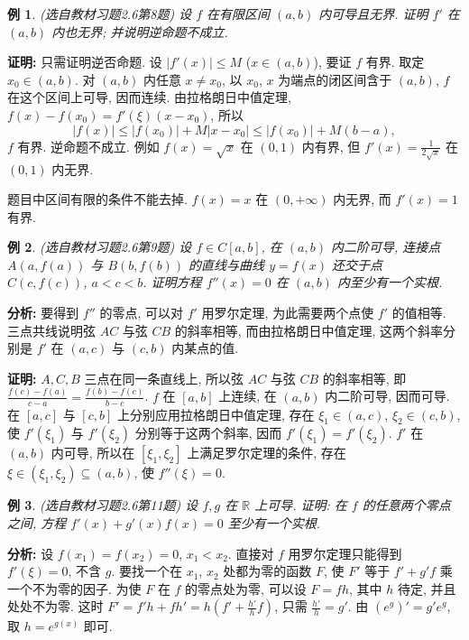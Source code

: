 \documentclass[UTF8,openany]{ctexbook}
\theoremstyle{chinesetextbook}
\newtheorem{example}{例}[section]
\newenvironment{cnproof}{\par\indent\textbf{证明:} \ignorespaces}{\par}
\begin{document}
\begin{example}\label{ex:c2-h6-8}
\textnormal{(选自教材习题2.6第8题)} 设 $f$ 在有限区间 $(a,b)$ 内可导且无界. 证明 $f'$ 在 $(a,b)$ 内也无界; 并说明逆命题不成立.
\end{example}
\begin{cnproof}
只需证明逆否命题. 设 $|f'(x)|\le M$ ($x\in(a,b)$), 要证 $f$ 有界. 取定 $x_0\in(a,b)$. 对 $(a,b)$ 内任意 $x\ne x_0$, 以 $x_0$, $x$ 为端点的闭区间含于 $(a,b)$, $f$ 在这个区间上可导, 因而连续. 由拉格朗日中值定理, $f(x)-f(x_0)=f'(\xi)(x-x_0)$, 所以
\[
|f(x)|\le|f(x_0)|+M|x-x_0|\le|f(x_0)|+M(b-a),
\]
$f$ 有界. 逆命题不成立. 例如 $f(x)=\sqrt x$ 在 $(0,1)$ 内有界, 但 $\displaystyle f'(x)=\frac1{2\sqrt x}$ 在 $(0,1)$ 内无界.
\end{cnproof}
题目中区间有限的条件不能去掉. $f(x)=x$ 在 $(0,+\infty)$ 内无界, 而 $f'(x)=1$ 有界.
\begin{example}\label{ex:c2-h6-9}
\textnormal{(选自教材习题2.6第9题)} 设 $f\in C[a,b]$, 在 $(a,b)$ 内二阶可导, 连接点 $A(a,f(a))$ 与 $B(b,f(b))$ 的直线与曲线 $y=f(x)$ 还交于点 $C(c,f(c))$, $a<c<b$. 证明方程 $f''(x)=0$ 在 $(a,b)$ 内至少有一个实根.
\end{example}
\par\indent\textbf{分析:} 要得到 $f''$ 的零点, 可以对 $f'$ 用罗尔定理, 为此需要两个点使 $f'$ 的值相等. 三点共线说明弦 $AC$ 与弦 $CB$ 的斜率相等, 而由拉格朗日中值定理, 这两个斜率分别是 $f'$ 在 $(a,c)$ 与 $(c,b)$ 内某点的值.
\begin{cnproof}
$A,C,B$ 三点在同一条直线上, 所以弦 $AC$ 与弦 $CB$ 的斜率相等, 即 $\displaystyle\frac{f(c)-f(a)}{c-a}=\frac{f(b)-f(c)}{b-c}$. $f$ 在 $[a,b]$ 上连续, 在 $(a,b)$ 内二阶可导, 因而可导. 在 $[a,c]$ 与 $[c,b]$ 上分别应用拉格朗日中值定理, 存在 $\xi_1\in(a,c)$, $\xi_2\in(c,b)$, 使 $f'(\xi_1)$ 与 $f'(\xi_2)$ 分别等于这两个斜率, 因而 $f'(\xi_1)=f'(\xi_2)$. $f'$ 在 $(a,b)$ 内可导, 所以在 $[\xi_1,\xi_2]$ 上满足罗尔定理的条件, 存在 $\xi\in(\xi_1,\xi_2)\subseteq(a,b)$, 使 $f''(\xi)=0$.
\end{cnproof}
\begin{example}\label{ex:c2-h6-11}
\textnormal{(选自教材习题2.6第11题)} 设 $f,g$ 在 $\mathbb R$ 上可导. 证明: 在 $f$ 的任意两个零点之间, 方程 $f'(x)+g'(x)f(x)=0$ 至少有一个实根.
\end{example}
\par\indent\textbf{分析:} 设 $f(x_1)=f(x_2)=0$, $x_1<x_2$. 直接对 $f$ 用罗尔定理只能得到 $f'(\xi)=0$, 不含 $g$. 要找一个在 $x_1$, $x_2$ 处都为零的函数 $F$, 使 $F'$ 等于 $f'+g'f$ 乘一个不为零的因子. 为使 $F$ 在 $f$ 的零点处为零, 可以设 $F=fh$, 其中 $h$ 待定, 并且处处不为零. 这时 $\displaystyle F'=f'h+fh'=h\left(f'+\frac{h'}hf\right)$, 只需 $\displaystyle\frac{h'}h=g'$. 由 $(e^{g})'=g'e^{g}$, 取 $h=e^{g(x)}$ 即可.
\end{document}
